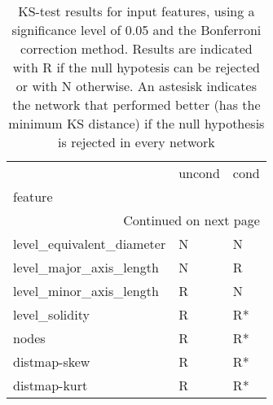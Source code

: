 \documentclass{report}
\begin{document}
\begin{longtable}{lll}
	\caption[Test results for input features]{ \small KS-test results for input features, using a significance level of 0.05 and the Bonferroni correction method. Results are indicated with R if the null hypotesis can be rejected or with N otherwise. An astesisk indicates the network that performed better (has the minimum KS distance) if the null hypothesis is rejected in every network}\\
	\toprule
	{} & uncond & cond \\
	feature                   &        &      \\
	\midrule
	\endhead
	\midrule
	\multicolumn{3}{r}{{Continued on next page}} \\
	\midrule
	\endfoot
	
	\bottomrule
	\endlastfoot
	level\_equivalent\_diameter &      N &    N \\
	level\_major\_axis\_length   &      N &    R \\
	level\_minor\_axis\_length   &      R &    N \\
	level\_solidity            &      R &   R* \\
	nodes                     &      R &   R* \\
	distmap-skew              &      R &   R* \\
	distmap-kurt              &      R &   R* \\
\end{longtable}
\end{document}
